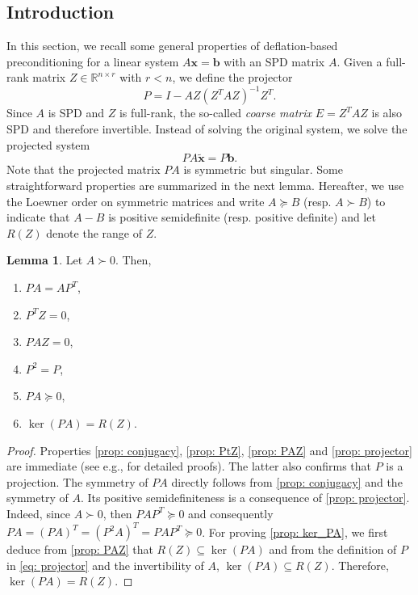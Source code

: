 \documentclass{article}
\numberwithin{equation}{section}
\theoremstyle{definition}
\newtheorem{lemma}[definition]{Lemma}
\begin{document}
\subsection{Introduction}
In this section, we recall some general properties of deflation-based preconditioning for a linear system $A\bm{x}=\bm{b}$ with an SPD matrix $A$. Given a full-rank matrix $Z \in \mathbb{R}^{n \times r}$ with $r<n$, we define the projector
\begin{equation}
\label{eq: projector}
    P = I-AZ(Z^TAZ)^{-1}Z^T.
\end{equation}
Since $A$ is SPD and $Z$ is full-rank, the so-called \emph{coarse matrix} $E=Z^TAZ$ is also SPD and therefore invertible. Instead of solving the original system, we solve the projected system
\begin{equation}
\label{eq: projected_system}
PA\tilde{\bm{x}}=P\bm{b}.
\end{equation}
Note that the projected matrix $PA$ is symmetric but singular. Some straightforward properties are summarized in the next lemma. Hereafter, we use the Loewner order on symmetric matrices and write $A \succeq B$ (resp. $A \succ B$) to indicate that $A-B$ is positive semidefinite (resp. positive definite) and let $R(Z)$ denote the range of $Z$.

\begin{lemma}
\label{lem: basic_properties}
Let $A \succ 0$. Then,
\begin{enumerate}[label=(\arabic*), itemsep=0pt, parsep=0pt]
    \item $PA=AP^T$, \label{prop: conjugacy}
    \item $P^TZ=0$, \label{prop: PtZ}
    \item $PAZ=0$, \label{prop: PAZ}
    \item $P^2=P$, \label{prop: projector}
    \item $PA \succeq 0$, \label{prop: SPSP}
    \item $\ker(PA)=R(Z)$. \label{prop: ker_PA}
\end{enumerate}
\end{lemma}
\begin{proof}
Properties \ref{prop: conjugacy}, \ref{prop: PtZ}, \ref{prop: PAZ} and \ref{prop: projector} are immediate (see e.g., \cite{vermolen2004deflation,tang2008two} for detailed proofs). The latter also confirms that $P$ is a projection. The symmetry of $PA$ directly follows from \ref{prop: conjugacy} and the symmetry of $A$. Its positive semidefiniteness is a consequence of \ref{prop: projector}. Indeed, since $A \succ 0$, then $PAP^T \succeq 0$ \cite{horn2012matrix} and consequently $PA=(PA)^T=(P^2A)^T=PAP^T \succeq 0$. For proving \ref{prop: ker_PA}, we first deduce from \ref{prop: PAZ} that $R(Z) \subseteq \ker(PA)$ and from the definition of $P$ in \eqref{eq: projector} and the invertibility of $A$, $\ker(PA) \subseteq R(Z)$. Therefore, $\ker(PA)=R(Z)$.
\end{proof}
\end{document}
